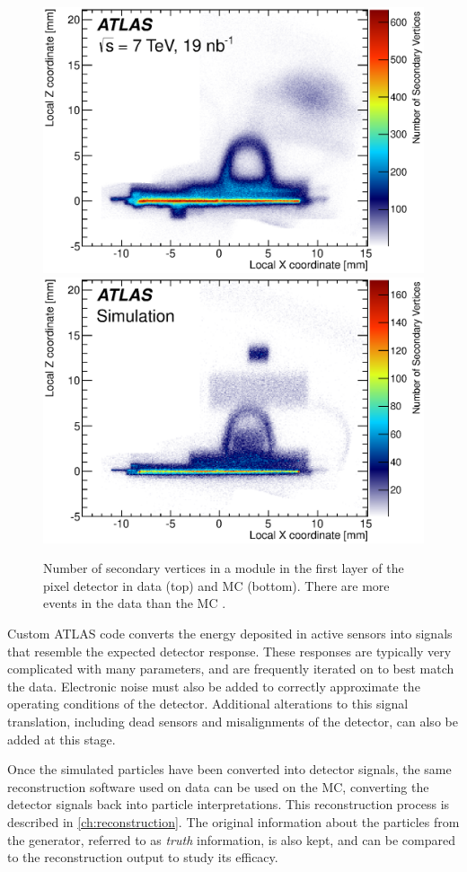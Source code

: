\begin{centering}
\begin{figure}[!hbt]
\myfloatalign
\includegraphics[width=.9\linewidth]{figures/theory/fig_10a.eps}
\includegraphics[width=.9\linewidth]{figures/theory/fig_10b.eps}
\caption{Number of secondary vertices in a module in the first layer of the pixel detector in data (top) and \ac{MC} (bottom). There are more events in the data than the \ac{MC} \cite{PERF-2015-06}.}
\label{fig:geant}
\end{figure}
\end{centering}

Custom ATLAS code converts the energy deposited in active sensors into signals that resemble the expected detector response. These responses are typically very complicated with many parameters, and are frequently iterated on to best match the data. Electronic noise must also be added to correctly approximate the operating conditions of the detector. Additional alterations to this signal translation, including dead sensors and misalignments of the detector, can also be added at this stage. 

Once the simulated particles have been converted into detector signals, the same reconstruction software used on data can be used on the \ac{MC}, converting the detector signals back into particle interpretations. This reconstruction process is described in \autoref{ch:reconstruction}. The original information about the particles from the generator, referred to as \textit{truth} information, is also kept, and can be compared to the reconstruction output to study its efficacy.






